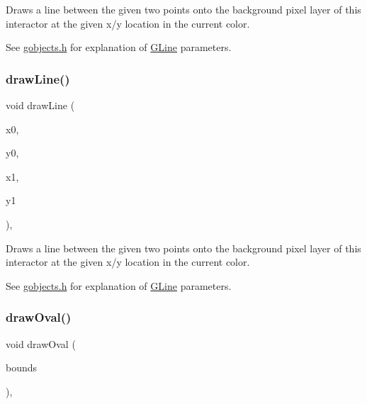 Draws a line between the given two points onto the background pixel layer of this interactor at the given x/y location in the current color. 

See \mbox{\hyperlink{gobjects_8h_source}{gobjects.\+h}} for explanation of \mbox{\hyperlink{classsgl_1_1GLine}{G\+Line}} parameters. \mbox{\label{classsgl_1_1GDrawingSurface_aff299fe83178d2f3ce8c08c06b583484}} 
\subsubsection{\texorpdfstring{draw\+Line()}{drawLine()}\hspace{0.1cm}{\footnotesize\ttfamily [2/2]}}
{\footnotesize\ttfamily void draw\+Line (\begin{DoxyParamCaption}\item[{double}]{x0,  }\item[{double}]{y0,  }\item[{double}]{x1,  }\item[{double}]{y1 }\end{DoxyParamCaption})\hspace{0.3cm}{\ttfamily [virtual]}, {\ttfamily [inherited]}}



Draws a line between the given two points onto the background pixel layer of this interactor at the given x/y location in the current color. 

See \mbox{\hyperlink{gobjects_8h_source}{gobjects.\+h}} for explanation of \mbox{\hyperlink{classsgl_1_1GLine}{G\+Line}} parameters. \mbox{\label{classsgl_1_1GDrawingSurface_a8adc13027efe311b4a6a715205b8bc46}} 
\subsubsection{\texorpdfstring{draw\+Oval()}{drawOval()}\hspace{0.1cm}{\footnotesize\ttfamily [1/2]}}
{\footnotesize\ttfamily void draw\+Oval (\begin{DoxyParamCaption}\item[{const \mbox{\hyperlink{structsgl_1_1GRectangle}{G\+Rectangle}} \&}]{bounds }\end{DoxyParamCaption})\hspace{0.3cm}{\ttfamily [virtual]}, {\ttfamily [inherited]}}



